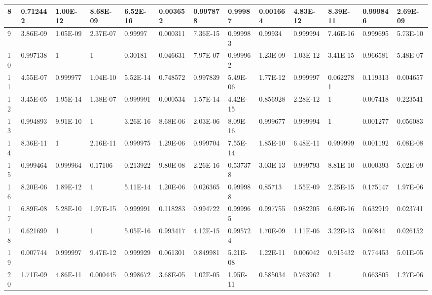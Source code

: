 \documentclass[a4paper,10pt]{article}
\begin{document}
\begin{centering}
{\begin{tabular}{ |l|l|l|l|l|l|l|l|l|l|l|l|l| }
8 	       & 0.712442 & 1.00E-12 & 8.68E-09 & 6.52E-16 & 0.003652 & 0.997878 &  0.99987  & 0.001664  & 4.83E-12 &  8.39E-11 & 0.999846 & 2.69E-09 \\ \hline              
9 	       & 3.86E-09 & 1.05E-09 & 2.37E-07 & 0.99997  & 0.000311 & 7.36E-15 &  0.999983 & 0.99934   & 0.999994 &  7.46E-16 & 0.999695 & 5.73E-10 \\ \hline             
10	       & 0.997138 & 1        & 1 	    & 0.30181  & 0.046631 & 7.97E-07 &  0.999962 & 1.23E-09  & 1.03E-12 &  3.41E-15 & 0.966581 & 5.48E-07 \\ \hline              
11	       & 4.55E-07 & 0.999977 & 1.04E-10 & 5.52E-14 & 0.748572 & 0.997839 &  5.49E-06 & 1.77E-12  & 0.999997 &  0.0622781& 0.119313 & 0.004657 \\ \hline                
12	       & 3.45E-05 & 1.95E-14 & 1.38E-07 & 0.999991 & 0.000534 & 1.57E-14 &  4.42E-15 & 0.856928  & 2.28E-12 &  1        & 0.007418 & 0.223541 \\ \hline         
13	       & 0.994893 & 9.91E-10 & 1 	    & 3.26E-16 & 8.68E-06 & 2.03E-06 &  8.09E-16 & 0.999677  & 0.999994 &  1        & 0.001277 & 0.056083 \\ \hline        
14	       & 8.36E-11 & 1        & 2.16E-11 & 0.999975 & 1.29E-06 & 0.999704 &  7.55E-14 & 1.85E-10  & 6.48E-11 &  0.999999 & 0.001192 & 6.08E-08 \\ \hline               
15	       & 0.999464 & 0.999964 & 0.17106  & 0.213922 & 9.80E-08 & 2.26E-16 &  0.537378 & 3.03E-13  & 0.999793 &  8.81E-10 & 0.000393 & 5.02E-09 \\ \hline               
16	       & 8.20E-06 & 1.89E-12 & 1  	    & 5.11E-14 & 1.20E-06 & 0.026365 &  0.999988 & 0.85713   & 1.55E-09 &  2.25E-15 & 0.175147 & 1.97E-06 \\ \hline             
17	       & 6.89E-08 & 5.28E-10 & 1.97E-15 & 0.999991 & 0.118283 & 0.994722 &  0.999965 & 0.997755  & 0.982205 &  6.69E-16 & 0.632919 & 0.023741 \\ \hline              
18	       & 0.621699 & 1        & 1   	    & 5.05E-16 & 0.993417 & 4.12E-15 &  0.995724 & 1.70E-09  & 1.11E-06 &  3.22E-13 & 0.60844  & 0.026152 \\ \hline             
19	       & 0.007744 & 0.999997 & 9.47E-12 & 0.999929 & 0.061301 & 0.849981 &  5.21E-08 & 1.22E-11  & 0.006042 &  0.915432 & 0.774453 & 5.01E-05 \\ \hline                
20	       & 1.71E-09 & 4.86E-11 & 0.000445 & 0.998672 & 3.68E-05 & 1.02E-05 &  1.95E-11 & 0.585034  & 0.763962 &  1        & 0.663805 & 1.27E-06 \\ \hline      

\end{tabular}}
\end{centering}
\end{document}
